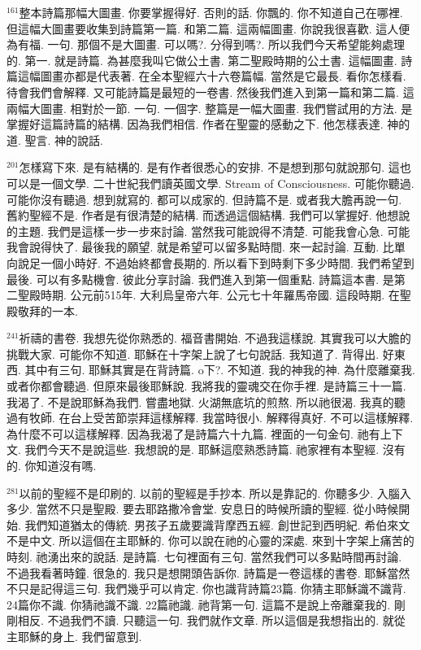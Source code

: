 \documentclass{book}
\begin{document}
$^{161}$整本詩篇那幅大圖畫.
你要掌握得好.
否則的話.
你飄的.
你不知道自己在哪裡.
但這幅大圖畫要收集到詩篇第一篇.
和第二篇.
這兩幅圖畫.
你說我很喜歡.
這人便為有福.
一句.
那個不是大圖畫.
可以嗎?.
分得到嗎?.
所以我們今天希望能夠處理的.
第一.
就是詩篇.
為甚麼我叫它做公土書.
第二聖殿時期的公土書.
這幅圖畫.
詩篇這幅圖畫亦都是代表著.
在全本聖經六十六卷篇幅.
當然是它最長.
看你怎樣看.
待會我們會解釋.
又可能詩篇是最短的一卷書.
然後我們進入到第一篇和第二篇.
這兩幅大圖畫.
相對於一節.
一句.
一個字.
整篇是一幅大圖畫.
我們嘗試用的方法.
是掌握好這篇詩篇的結構.
因為我們相信.
作者在聖靈的感動之下.
他怎樣表達.
神的道.
聖言.
神的說話.

$^{201}$怎樣寫下來.
是有結構的.
是有作者很悉心的安排.
不是想到那句就說那句.
這也可以是一個文學.
二十世紀我們讀英國文學.
Stream of Consciousness.
可能你聽過.
可能你沒有聽過.
想到就寫的.
都可以成家的.
但詩篇不是.
或者我大膽再說一句.
舊約聖經不是.
作者是有很清楚的結構.
而透過這個結構.
我們可以掌握好.
他想說的主題.
我們是這樣一步一步來討論.
當然我可能說得不清楚.
可能我會心急.
可能我會說得快了.
最後我的願望.
就是希望可以留多點時間.
來一起討論.
互動.
比單向說足一個小時好.
不過始終都會長期的.
所以看下到時剩下多少時間.
我們希望到最後.
可以有多點機會.
彼此分享討論.
我們進入到第一個重點.
詩篇這本書.
是第二聖殿時期.
公元前515年.
大利烏皇帝六年.
公元七十年羅馬帝國.
這段時期.
在聖殿敬拜的一本.

$^{241}$祈禱的書卷.
我想先從你熟悉的.
福音書開始.
不過我這樣說.
其實我可以大膽的挑戰大家.
可能你不知道.
耶穌在十字架上說了七句說話.
我知道了.
背得出.
好東西.
其中有三句.
耶穌其實是在背詩篇.
o下?.
不知道.
我的神我的神.
為什麼離棄我.
或者你都會聽過.
但原來最後耶穌說.
我將我的靈魂交在你手裡.
是詩篇三十一篇.
我渴了.
不是說耶穌為我們.
嘗盡地獄.
火湖無底坑的煎熬.
所以祂很渴.
我真的聽過有牧師.
在台上受苦節崇拜這樣解釋.
我當時很小.
解釋得真好.
不可以這樣解釋.
為什麼不可以這樣解釋.
因為我渴了是詩篇六十九篇.
裡面的一句金句.
祂有上下文.
我們今天不是說這些.
我想說的是.
耶穌這麼熟悉詩篇.
祂家裡有本聖經.
沒有的.
你知道沒有嗎.

$^{281}$以前的聖經不是印刷的.
以前的聖經是手抄本.
所以是靠記的.
你聽多少.
入腦入多少.
當然不只是聖殿.
要去耶路撒冷會堂.
安息日的時候所讀的聖經.
從小時候開始.
我們知道猶太的傳統.
男孩子五歲要識背摩西五經.
創世記到西明紀.
希伯來文不是中文.
所以這個在主耶穌的.
你可以說在祂的心靈的深處.
來到十字架上痛苦的時刻.
祂湧出來的說話.
是詩篇.
七句裡面有三句.
當然我們可以多點時間再討論.
不過我看著時鐘.
很急的.
我只是想開頭告訴你.
詩篇是一卷這樣的書卷.
耶穌當然不只是記得這三句.
我們幾乎可以肯定.
你也識背詩篇23篇.
你猜主耶穌識不識背.
24篇你不識.
你猜祂識不識.
22篇祂識.
祂背第一句.
這篇不是說上帝離棄我的.
剛剛相反.
不過我們不讀.
只聽這一句.
我們就作文章.
所以這個是我想指出的.
就從主耶穌的身上.
我們留意到.
\end{document}
